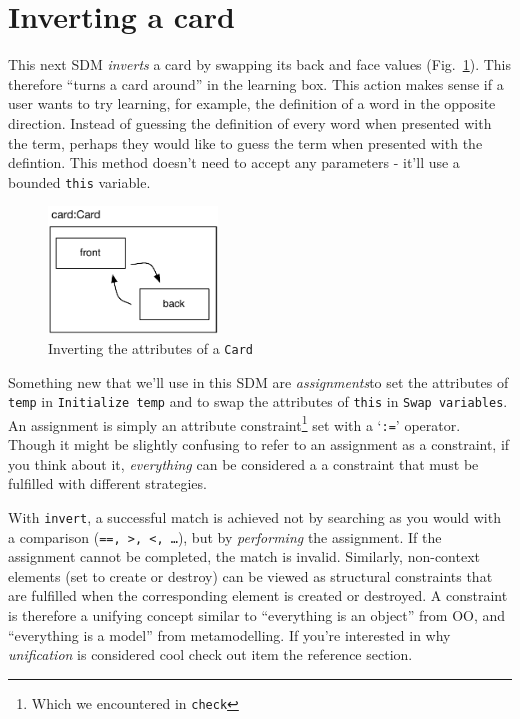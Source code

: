 \newpage
\hypertarget{sec:invertCard}{}
\section{Inverting a card}
\genHeader

This next SDM \emph{inverts} a card by swapping its back and face values (Fig.~\ref{fig:goal_invert}). This therefore ``turns a card around'' in the learning
box. This action makes sense if a user wants to try learning, for example, the definition of a word in the opposite direction. Instead of guessing the
definition of every word when presented with the term, perhaps they would like to guess the term when presented with the defintion. This method doesn't need to
accept any parameters - it'll use a bounded \texttt{this} variable.

\vspace{0.5cm}

\begin{figure}[htbp]
	\centering
    \includegraphics[width=0.4\textwidth]{goal_invert.pdf}
 	\caption{Inverting the attributes of a \texttt{Card}}
 	\label{fig:goal_invert}
\end{figure}
\FloatBarrier

Something new that we'll use in this SDM are \emph{assignments}to set the attributes of \texttt{temp} in \texttt{Initialize temp} and to
swap the attributes of \texttt{this} in \texttt{Swap variables}. An assignment is simply an attribute constraint\footnote{Which we encountered in
\texttt{check}} set with a `\texttt{:=}' operator. Though it might be slightly confusing to refer to an assignment as a constraint, if you think about it,
\emph{everything} can be considered a a constraint that must be fulfilled with different strategies. 

With \texttt{invert}, a successful match is achieved not by searching as you would with a comparison (\texttt{==, >, <, \ldots}), but by \emph{performing} the
assignment. If the assignment cannot be completed, the match is invalid. Similarly, non-context elements (set to create or destroy) can be viewed as structural
constraints that are fulfilled when the corresponding element is created or destroyed.  A constraint is therefore a unifying concept similar to ``everything is
an object'' from OO, and ``everything is a model'' from metamodelling.  If you're interested in why \emph{unification} is considered cool check out
item \cite{BEZ05} the reference section.








